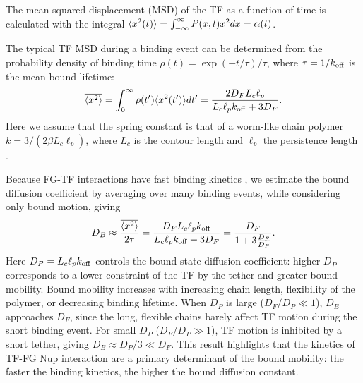 The mean-squared displacement (MSD) of the TF as a function of time is calculated with the integral
$\langle x^2(t) \rangle = \int_{-\infty}^{\infty} P(x,t) x^2 dx = \alpha(t)$.  




The typical TF MSD during a binding event can be determined from the probability density of binding time $\rho (t) = \exp(-t/\tau)/\tau$, where $\tau = 1/k_{\rm off}$ is the mean bound lifetime:
\begin{equation}\label{eq:sho}
  \overline{\langle x^2 \rangle} = \int_0^{\infty} \rho(t') \langle x^2(t') \rangle dt' = \frac{2D_F L_c
    \ell_p}{L_c \ell_p k_{\rm off}+ 3D_F}. 
\end{equation} 
Here we assume that the spring constant is that of a worm-like chain polymer $k = 3/(2\beta L_c \ell_p)$, where $L_c$ is the contour length and $\ell_p$ the persistence length \cite{howard01}.

Because FG-TF interactions have fast binding kinetics \cite{milles15, hough15}, we estimate the bound diffusion coefficient by averaging over many binding events, while considering only bound motion, giving \begin{equation}\label{eq:dbound}
  D_B \approx \frac{\overline{\langle x^2 \rangle}}{2\tau} = \frac{D_F L_c \ell_p
    k_{\mathrm{off}}}{L_c \ell_p k_{\mathrm{off}} + 3D_F} =
  \frac{D_F}{1+3\frac{D_F}{D_{P}}}.  
\end{equation}
Here $D_P = L_c \ell_p k_{\mathrm{off}}$ controls the bound-state diffusion coefficient: higher $D_P$ corresponds to a lower constraint of the TF by the tether and greater bound mobility. Bound mobility increases with increasing chain length, flexibility of the polymer, or decreasing binding lifetime. When $D_P$ is large ($D_F/D_P\ll1$), $D_B$ approaches $D_F$, since the long, flexible chains barely affect TF motion during the short binding event. For small $D_P$ ($D_F/D_P\gg1$), TF motion is inhibited by a short tether, giving $D_B\approx D_P/3\ll D_F$.  This result highlights that the kinetics of TF-FG Nup interaction are a primary determinant of the bound mobility: the faster the binding kinetics, the higher the bound diffusion constant.

